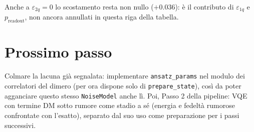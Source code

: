 \documentclass[11pt,a4paper]{article}
\begin{document}
\noindent Anche a $\varepsilon_{2q}=0$ lo scostamento resta non nullo
($+0.036$): è il contributo di $\varepsilon_{1q}$ e $p_\text{readout}$, non
ancora annullati in questa riga della tabella.

\section*{Prossimo passo}

Colmare la lacuna già segnalata: implementare \texttt{ansatz\_params} nel
modulo dei correlatori del dimero (per ora dispone solo di
\texttt{prepare\_state}), così da poter agganciare questo stesso
\texttt{NoiseModel} anche lì. Poi, Passo 2 della pipeline: VQE con termine
DM sotto rumore come stadio a sé (energia e fedeltà rumorose confrontate
con l'esatto), separato dal suo uso come preparazione per i passi
successivi.
\end{document}
